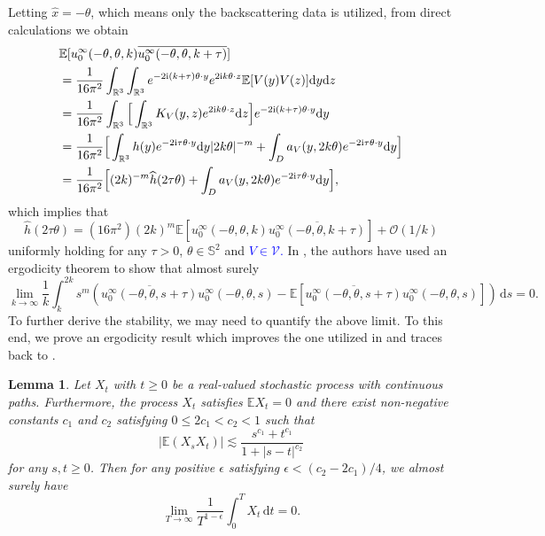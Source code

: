 \documentclass[reqno, 12pt]{amsart}
\newtheorem{Le}{Lemma}[section]
\numberwithin{equation}{section}
\begin{document}
Letting $\hat{x}=-\theta$, which means only the backscattering data is utilized, from direct calculations we obtain \begin{align*}
	&\mathbb E[u_0^\infty(-\theta,\theta, k) \overline{u_0^\infty(-\theta,\theta, k+\tau)}]\\
	&=\frac{1}{16\pi^2}\int_{\mathbb R^3}\int_{\mathbb R^3} e^{-2{\rm i}(k+\tau)\theta \cdot y}  e^{2{\rm i}k\theta \cdot z}
	\mathbb E[V(y)V(z)]{\rm d}y{\rm d}z\\
	&= \frac{1}{16\pi^2}\int_{\mathbb R^3} \Big[\int_{\mathbb R^3} K_V(y, z)e^{2{\rm i}k\theta\cdot z}{\rm d}z\Big]
	e^{-2{\rm i}(k+\tau)\theta \cdot y}{\rm d}y \\
	&= \frac{1}{16\pi^2} \Big[\int_{\mathbb R^3} h(y) e^{-2{\rm i}\tau\theta\cdot y}{\rm d}y |2k\theta|^{-m} + \int_{D} a_V(y, 2k\theta) 
	e^{-2{\rm i}\tau\theta\cdot y}{\rm d}y\Big]\\
	&= \frac{1}{16\pi^2} \Big[(2k)^{-m}\widehat{h}(2\tau\theta) + \int_{D} a_V(y, 2k\theta) 
	e^{-2{\rm i}\tau\theta\cdot y}{\rm d}y\Big],\end{align*} which implies that \begin{equation}\label{firststep}
\widehat{h}(2\tau\theta)=(16\pi^2)(2k)^{m} \mathbb E[u_0^\infty(-\theta,\theta, k) \overline{u_0^\infty(-\theta,\theta, k+\tau)}]+\mathcal{O}(1/k)
    \end{equation} uniformly holding for any $\tau>0$, $\theta \in \mathbb S^2$ and \textcolor{blue}{ $V\in\mathcal V$.} In \cite{Caro}, the authors have used an ergodicity theorem to show that almost surely \begin{equation*}
	\lim_{k \to \infty}\frac{1}{k}\int_k^{2k}s^{m}(\overline{u_0^\infty(-\theta,\theta, s+\tau)} u_0^\infty(-\theta,\theta, s)-\mathbb{E}[\overline{u_0^\infty(-\theta,\theta, s+\tau)} u_0^\infty(-\theta,\theta,s)])\,\mathrm{d}s=0.
\end{equation*} 
To further derive the stability, we may need to quantify the above limit. 
To this end, we prove an ergodicity result which improves the one utilized in \cite{Caro} and traces back to \cite[p. 94]{cramer1967stationary}.
\begin{Le}\label{Thm2.1}
	Let $X_t$ with $t \ge 0$ be a real-valued stochastic process with continuous paths. Furthermore, the process $X_t$ satisfies $\mathbb{E}X_t=0$ and there exist non-negative constants $c_1$ and $c_2$ satisfying $0 \le 2 c_1 < c_2 <1$ such that \[
	| \mathbb{E}(X_s X_t) |\lesssim \frac{s^{c_1}+t^{c_1}}{1+|s-t|^{c_2}}
	\] for any $s,t  \ge 0$. Then for any positive $\epsilon$ satisfying $\epsilon < (c_2-2c_1) /4$, we almost surely have \[
	\lim_{T \to \infty} \frac{1}{T^{1-\epsilon}} \int_0^T X_t \,\mathrm{d}t =0
	.\]
\end{Le}
\end{document}
